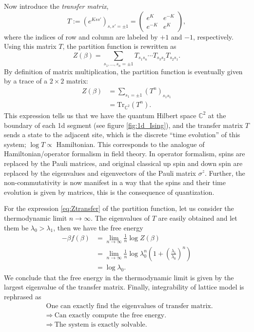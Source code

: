 Now introduce the \emph{transfer matrix},
\begin{equation}
  T  :=  \left(e^{Kss'}\right)_{s,s'=\pm1}
    =
    \left(\begin{array}{ll}
  e^{K}  &  e^{-K}  \\
  e^{-K}  &  e^{K}
\end{array}\right),
\end{equation}
where the indices of row and column are labeled by $+1$ and $-1$,
respectively. Using this matrix $T$, the partition function is rewritten
as
\begin{equation}
  Z\left(\beta\right)
    =\sum_{s_{1},\ldots,s_{n}=\pm1}  T_{s_{1}s_{n}}  \cdots  T_{s_{3}s_{2}}T_{s_{2}s_{1}}.
\end{equation}
By definition of matrix multiplication, the partition function is
eventually given by a trace of a $2\times 2$ matrix:
\begin{align}
  Z(\beta)
  & =  \sum_{s_{1}=\pm1}\left(T^{n}\right)_{s_{1}s_{1}}  \nonumber \\
  & =  \mathrm{Tr}_{\mathbb{C}^{2}}\left(T^{n}\right).
\label{eq:Ztransfer}
\end{align}
This expression tells us that we have the quantum Hilbert space $\mathbb{C}^{2}$
at the boundary of each 1d segment (see figure \ref{fig:1d_Ising}), and the transfer matrix $T$ sends
a state to the adjacent site, which is the discrete ``time evolution''
of this system; $\log T\propto$ Hamiltonian.
This corresponds to the analogue of Hamiltonian/operator
formalism in field theory. In operator formalism, spins
are replaced by the Pauli matrices, and original classical up spin
and down spin are replaced by the eigenvalues and eigenvectors of
the Pauli matrix $\sigma^{z}$. Further, the non-commutativity is
now manifest in a way that the spins and their time evolution is given
by matrices, this is the consequence of quantization.

For the expression \eqref{eq:Ztransfer} of the partition function, let us consider
the thermodynamic limit $n\to\infty$. The eigenvalues of
$T$ are easily obtained and let them be $\lambda_{0}>\lambda_{1}$,
then we have the free energy
\begin{align}
-\beta f(\beta)
  & =  \lim_{n\to\infty}\frac{1}{n}\log Z(\beta)\nonumber \\
  & =  \lim_{n\to\infty}\frac{1}{n}\log\lambda_{0}^n\left(1+\left(\frac{\lambda_{1}}{\lambda_{0}}\right)^{n}\right)\nonumber \\
  & =  \log\lambda_{0}.
\end{align}
We conclude that the free energy in the thermodynamic limit is
given by the largest eigenvalue of the transfer matrix. Finally, integrability
of lattice model is rephrased as
\begin{align*}
  &  \textrm{One can exactly find the eigenvalues of transfer matrix.} \\
  &  \Rightarrow  ~  \textrm{Can exactly compute the free energy.} \\
  &  \Rightarrow  ~  \textrm{The system is exactly solvable.}
\end{align*}

